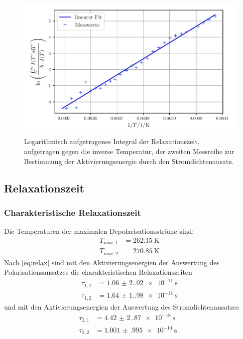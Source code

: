 \begin{figure}
    \centering
    \includegraphics[width=0.7\linewidth]{scripts/build/plot2_2.pdf}
    \caption{Logarithmisch aufgetragenes Integral der Relaxationszeit, aufgetragen gegen die inverse Temperatur, der zweiten Messreihe zur Bestimmung der Aktivierungsenergie durch den Stromdichtenansatz.}
    \label{fig:W2_2}
\end{figure}

\subsection{Relaxationszeit}
\subsubsection{Charakteristische Relaxationszeit}
Die Temperaturen der maximalen Depolarisationsströme sind:
\begin{align}
    T_{max,1} &= \qty{262.15}{\kelvin} \\
    T_{max,2} &= \qty{270.85}{\kelvin}
\end{align}
Nach \autoref{eq:relax} sind mit den Aktivierungsenergien der Auswertung des Polarisationsansatzes
die charakteristischen Relaxationszeiten
\begin{align}
    \tau_{1,1} &= \qty{1.06(2.02)e-11}{\second}\\
    \tau_{1,2} &= \qty{1.64(1.98)e-11}{\second}
\end{align}
und mit den Aktivierungsenergien der Auswertung des Stromdichtenansatzes
\begin{align}
    \tau_{2,1} &= \qty{4.42(2.87)e-18}{\second}\\
    \tau_{2,2} &= \qty{1.001(995)e-14}{\second}\, .
\end{align}
